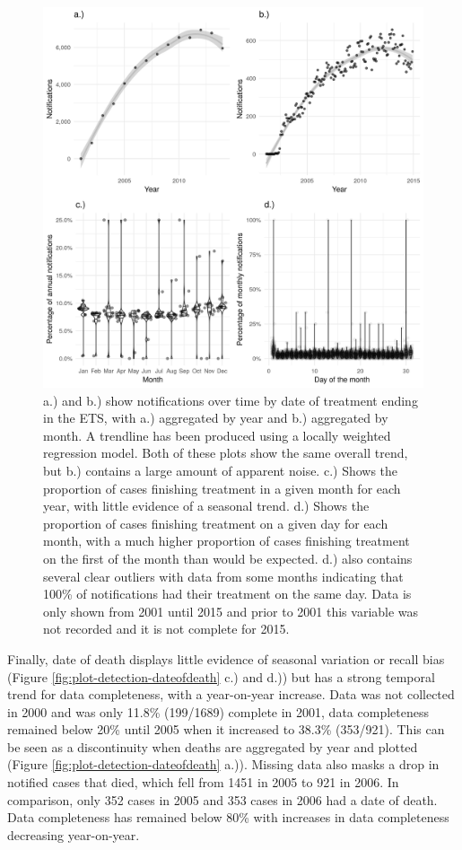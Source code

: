 \documentclass[11pt,twoside]{bristolthesis}
\begin{document}
  \begin{figure}
  
  {\centering \includegraphics[width=0.8\linewidth,]{chapters/tb-epi-england/figures/plot-detection-treatend} 
  
  }
  
  \caption[a.) and b.) show notifications over time by date of treatment ending in the ETS, with a.) aggregated by year and  b.) aggregated by month.]{a.) and b.) show notifications over time by date of treatment ending in the ETS, with a.) aggregated by year and  b.) aggregated by month. A trendline has been produced using a locally weighted regression model. Both of these plots show the same overall trend, but b.) contains a large amount of apparent noise. c.) Shows the proportion of cases finishing treatment in a given month for each year, with little evidence of a seasonal trend. d.) Shows the proportion of cases finishing treatment on a given day for each month, with a much higher proportion of cases finishing treatment on the first of the month than would be expected. d.) also contains several clear outliers with data from some months indicating that 100\% of notifications had their treatment on the same day. Data is only shown from 2001 until 2015 and prior to 2001 this variable was not recorded and it is not complete for 2015.}\label{fig:plot-detection-treatend}
  \end{figure}
  Finally, date of death displays little evidence of seasonal variation or recall bias (Figure \ref{fig:plot-detection-dateofdeath} c.) and d.)) but has a strong temporal trend for data completeness, with a year-on-year increase. Data was not collected in 2000 and was only 11.8\% (199/1689) complete in 2001, data completeness remained below 20\% until 2005 when it increased to 38.3\% (353/921). This can be seen as a discontinuity when deaths are aggregated by year and plotted (Figure \ref{fig:plot-detection-dateofdeath} a.)). Missing data also masks a drop in notified cases that died, which fell from 1451 in 2005 to 921 in 2006. In comparison, only 352 cases in 2005 and 353 cases in 2006 had a date of death. Data completeness has remained below 80\% with increases in data completeness decreasing year-on-year.
\end{document}
